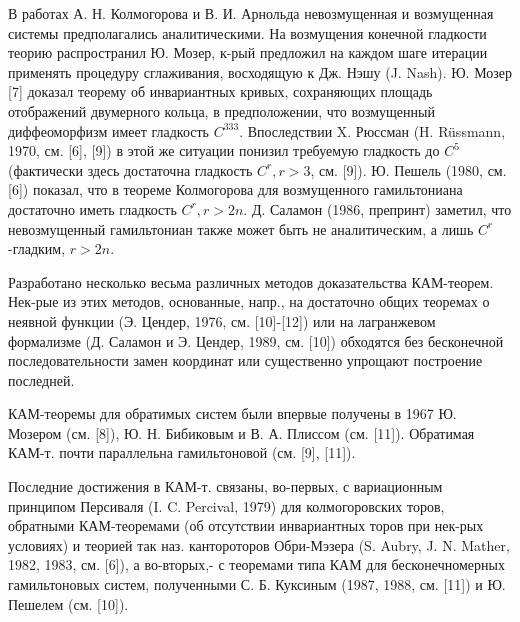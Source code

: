 \documentclass[10pt]{article}
\begin{document}
В работах А. Н. Колмогорова и В. И. Арнольда невозмущенная и возмущенная системы предполагались аналитическими. На возмущения конечной гладкости теорию распространил Ю. Мозер, к-рый предложил на каждом шаге итерации применять процедуру сглаживания, восходящую к Дж. Нэшу (J. Nash). Ю. Мозер [7] доказал теорему об инвариантных кривых, сохраняющих площадь отображений двумерного кольца, в предположении, что возмущенный диффеоморфизм имеет гладкость $C^{333}$. Впоследствии X. Рюссман (H. Rüssmann, 1970, см. [6], [9]) в этой же ситуации понизил требуемую гладкость до $C^{5}$ (фактически здесь достаточна гладкость $C^{r}, r>3$, см. [9]). Ю. Пешель (1980, см. [6]) показал, что в теореме Колмогорова для возмущенного гамильтониана достаточно иметь гладкость $C^{r}, r>2 n$. Д. Саламон (1986, препринт) заметил, что невозмущенный гамильтониан также может быть не аналитическим, а лишь $C^{r}$-гладким, $r>2 n$.



Разработано несколько весьма различных методов доказательства КАМ-теорем. Нек-рые из этих методов, основанные, напр., на достаточно общих теоремах о неявной функции (Э. Цендер, 1976, см. [10]-[12]) или на лагранжевом формализме (Д. Саламон и Э. Цендер, 1989, см. [10]) обходятся без бесконечной последовательности замен координат или существенно упрощают построение последней.



КАМ-теоремы для обратимых систем были впервые получены в 1967 Ю. Мозером (см. [8]), Ю. Н. Бибиковым и В. А. Плиссом (см. [11]). Обратимая КАМ-т. почти параллельна гамильтоновой (см. [9], [11]).



Последние достижения в КАМ-т. связаны, во-первых, с вариационным принципом Персиваля (I. C. Percival, 1979) для колмогоровских торов, обратными КАМ-теоремами (об отсутствии инвариантных торов при нек-рых условиях) и теорией так наз. кантороторов Обри-Мэзера (S. Aubry, J. N. Mather, 1982, 1983, см. [6]), а во-вторых,- с теоремами типа КАМ для бесконечномерных гамильтоновых систем, полученными С. Б. Куксиным (1987, 1988, см. [11]) и Ю. Пешелем (см. [10]).
\end{document}
